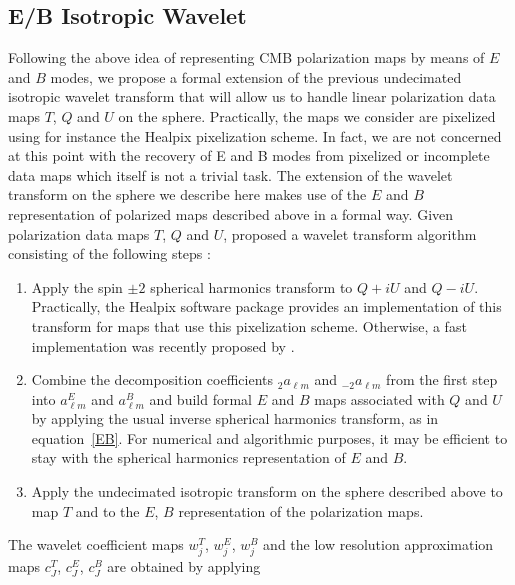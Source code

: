\subsection{E/B Isotropic Wavelet}
Following the above idea of representing CMB polarization maps by means of $E$ and $B$ modes, we propose a formal extension of the previous 
undecimated isotropic wavelet transform that will allow us to handle linear polarization data maps $T$, $Q$ and $U$ on the sphere. Practically, 
the maps we consider are pixelized using for instance the Healpix pixelization scheme. In fact, we are not concerned at this point with the 
recovery of E and B modes from pixelized or incomplete data maps which itself is not a trivial task. The extension of the wavelet transform 
on the sphere we describe here makes use of the $E$ and $B$ representation of polarized maps described above in a formal way. Given polarization 
data maps $T$, $Q$ and $U$, \citet{starck:pola09} proposed a  wavelet transform algorithm consisting of the following steps : 
\vspace{.1cm}
\begin{center}
\begin{minipage}[b]{0.85\linewidth}
\footnotesize{
\begin{enumerate}
\item Apply the spin $\pm 2$ spherical harmonics transform to $Q+iU$ and $Q-iU$. Practically, the Healpix software package provides an implementation 
of this transform for maps that use this pixelization scheme. Otherwise, a fast implementation was recently proposed by \citep{wiauxspin2}.
\item Combine the decomposition coefficients ${ _{2}a_{\ell m}}$ and ${ _{-2}a_{\ell m}}$ from the first step into $a_{\ell m}^E$ and $a_{\ell m}^B$ 
and build formal $E$ and $B$ maps associated with $Q$ and $U$ by applying the usual inverse spherical harmonics transform, as in equation~\eqref{EB}. 
For numerical and algorithmic purposes, it may be efficient to stay with the spherical harmonics representation of $E$ and $B$.
\item Apply the undecimated isotropic transform on the sphere described above to map $T$ and to the $E$, $B$ representation of the polarization maps. 
\end{enumerate}}
\end{minipage}
\end{center}
\vspace{.1cm}
The wavelet coefficient maps  $w_j^T$, $w_j^E$, $w_j^B$ and the low resolution approximation maps $c_J^T$, $c_J^E$, $c_J^B$ are obtained by applying 
